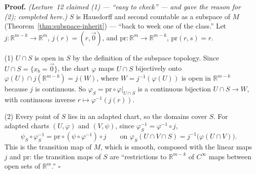 \documentclass[11pt]{report}
\renewenvironment{proof}[1][Proof]{\noindent\textbf{#1.} }{\hfill$\square$\par\vspace{5pt}}
\begin{document}
\begin{proof}
\textit{(Lecture~12 claimed (1) --- ``easy to check'' --- and gave the reason for (2); completed here.)} $S$ is Hausdorff and second countable as a subspace of $M$ (Theorem~\ref{thm:subspace-inherit}) --- ``back to week one of the class.'' Let $j : \mathbb{R}^{m-k} \to \mathbb{R}^m$, $j(r) = (r, \vec 0)$, and $\mathrm{pr} : \mathbb{R}^m \to \mathbb{R}^{m-k}$, $\mathrm{pr}(r, s) = r$.

(1) $U \cap S$ is open in $S$ by the definition of the subspace topology. Since $U \cap S = \{x_b = \vec 0\}$, the chart $\varphi$ maps $U \cap S$ bijectively onto $\varphi(U) \cap j(\mathbb{R}^{m-k}) = j(W)$, where $W = j^{-1}(\varphi(U))$ is open in $\mathbb{R}^{m-k}$ because $j$ is continuous. So $\varphi_S = \mathrm{pr} \circ \varphi|_{U \cap S}$ is a continuous bijection $U \cap S \to W$, with continuous inverse $r \mapsto \varphi^{-1}(j(r))$.

(2) Every point of $S$ lies in an adapted chart, so the domains cover $S$. For adapted charts $(U, \varphi)$ and $(V, \psi)$, since $\varphi_S^{-1} = \varphi^{-1} \circ j$,
\[
\psi_S \circ \varphi_S^{-1} = \mathrm{pr} \circ (\psi \circ \varphi^{-1}) \circ j \qquad \text{on } \varphi_S(U \cap V \cap S) = j^{-1}\big(\varphi(U \cap V)\big) .
\]
This is the transition map of $M$, which is smooth, composed with the linear maps $j$ and $\mathrm{pr}$: the transition maps of $S$ are ``restrictions to $\mathbb{R}^{m-k}$ of $C^\infty$ maps between open sets of $\mathbb{R}^m$.''
\end{proof}
\end{document}
